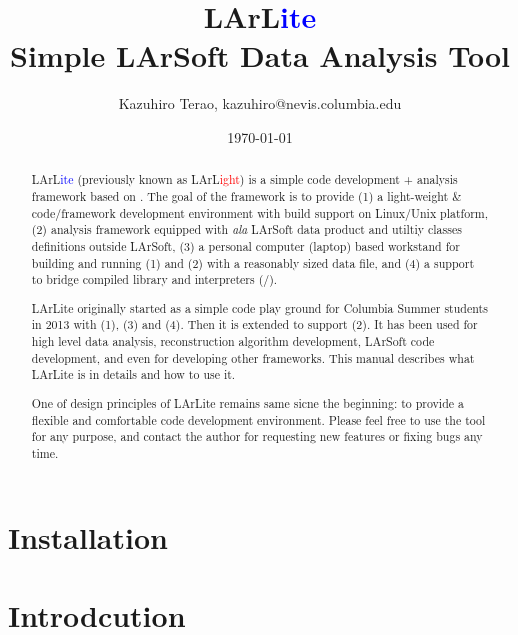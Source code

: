 \documentclass[a4paper,12pt]{report}
\begin{document}
\title{LArL{\textcolor{blue}{ite}} \\ \vspace{0.1in} Simple LArSoft Data Analysis Tool}
\date{\today}
\author{Kazuhiro Terao, kazuhiro@nevis.columbia.edu}
\maketitle

\begin{abstract}
LArL{\textcolor{blue}{ite}} (previously known as LArL{\textcolor{red}{ight}}) is a simple \CPP code development + analysis framework based on \ROOT. The goal of the framework is to provide 
(1) a light-weight \CPP \& \ROOT code/framework development environment with build support on Linux/Unix platform, 
(2) analysis framework equipped with {\it ala} LArSoft data product and utiltiy classes definitions outside LArSoft,
(3) a personal computer (laptop) based workstand for building and running (1) and (2) with a reasonably sized data file,
and
(4) a support to bridge \CPP compiled library and interpreters (\CINT/\python).

LArLite originally started as a simple \CPP code play ground for Columbia Summer students in 2013 with (1), (3) and (4). Then it is extended to support (2). It has been used for high level data analysis, reconstruction algorithm development, LArSoft code development, and even for developing other frameworks. This manual describes what LArLite is in details and how to use it.

One of design principles of LArLite remains same sicne the beginning: to provide a flexible and comfortable code development environment.
Please feel free to use the tool for any purpose, and contact the author for requesting new features or fixing bugs any time. 
\end{abstract}


\tableofcontents

\newpage
\chapter{Installation}
\label{chap:installation}


\chapter{Introdcution}
\label{chap:introduction}

 
\end{document}
